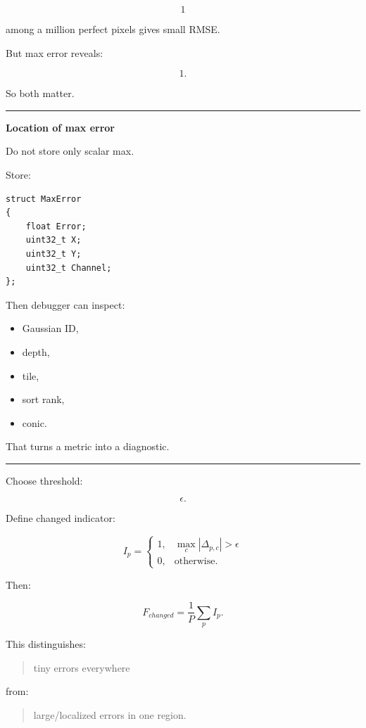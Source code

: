 \[
1
\]

among a million perfect pixels gives small RMSE.

But max error reveals:

\[
1.
\]

So both matter.

\begin{center}\rule{0.5\linewidth}{0.5pt}\end{center}

\textbf{Location of max error}

Do not store only scalar max.

Store:

\protect{}\label{vgsyyh}%
\begin{verbatim}
struct MaxError
{
    float Error;
    uint32_t X;
    uint32_t Y;
    uint32_t Channel;
};
\end{verbatim}

Then debugger can inspect:

\begin{itemize}
\tightlist
\item
  Gaussian ID,
\item
  depth,
\item
  tile,
\item
  sort rank,
\item
  conic.
\end{itemize}

That turns a metric into a diagnostic.

\begin{center}\rule{0.5\linewidth}{0.5pt}\end{center}

Choose threshold:

\[
\epsilon.
\]

Define changed indicator:

\[
I_p=
\begin{cases}
1,&
\max_c|\Delta_{p,c}|>\epsilon\\
0,&
\text{otherwise}.
\end{cases}
\]

Then:

\[
\boxed{
F_{changed}
=
\frac1P
\sum_p I_p.
}
\]

This distinguishes:

\begin{quote}
tiny errors everywhere
\end{quote}

from:

\begin{quote}
large/localized errors in one region.
\end{quote}

